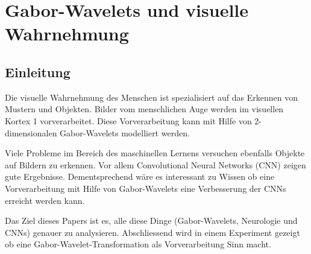 %
%
%
\chapter{Gabor-Wavelets und visuelle Wahrnehmung\label{chapter:visuell}}
\begin{refsection}

\section{Einleitung}

Die visuelle Wahrnehmung des Menschen ist spezialisiert auf das Erkennen von Mustern und Objekten.
Bilder vom menschlichen Auge werden im visuellen Kortex 1 vorverarbeitet.
Diese Vorverarbeitung kann mit Hilfe von 2-dimensionalen Gabor-Wavelets modelliert werden.

Viele Probleme im Bereich des maschinellen Lernens versuchen ebenfalls Objekte auf Bildern zu erkennen.
Vor allem Convolutional Neural Networks (CNN) zeigen gute Ergebnisse.
Dementsprechend wäre es interessant zu Wissen ob eine Vorverarbeitung mit Hilfe von Gabor-Wavelets eine Verbesserung der CNNs erreicht werden kann.

Das Ziel dieses Papers ist es, alle diese Dinge (Gabor-Wavelets, Neurologie und CNNs) genauer zu analysieren.
Abschliessend wird in einem Experiment gezeigt ob eine Gabor-Wavelet-Transformation als Vorverarbeitung Sinn macht.









\printbibliography[heading=subbibliography]
\end{refsection}
